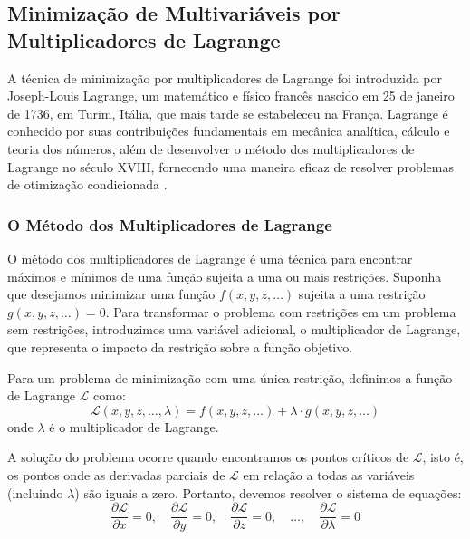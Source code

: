 \subsection{Minimização de Multivariáveis por Multiplicadores de Lagrange}

A técnica de minimização por multiplicadores de Lagrange foi introduzida por Joseph-Louis Lagrange, um matemático e físico francês nascido em 25 de janeiro de 1736, em Turim, Itália, que mais tarde se estabeleceu na França. Lagrange é conhecido por suas contribuições fundamentais em mecânica analítica, cálculo e teoria dos números, além de desenvolver o método dos multiplicadores de Lagrange no século XVIII, fornecendo uma maneira eficaz de resolver problemas de otimização condicionada \cite{lagrange}.

\subsubsection{O Método dos Multiplicadores de Lagrange}

O método dos multiplicadores de Lagrange é uma técnica para encontrar máximos e mínimos de uma função sujeita a uma ou mais restrições. Suponha que desejamos minimizar uma função $f(x, y, z, \dots)$ sujeita a uma restrição $g(x, y, z, \dots) = 0$. Para transformar o problema com restrições em um problema sem restrições, introduzimos uma variável adicional, o multiplicador de Lagrange, que representa o impacto da restrição sobre a função objetivo.

Para um problema de minimização com uma única restrição, definimos a função de Lagrange $\mathcal{L}$ como:
\begin{equation}
\mathcal{L}(x, y, z, \dots, \lambda) = f(x, y, z, \dots) + \lambda \cdot g(x, y, z, \dots)
\label{eq:lagrange_single_constraint}
\end{equation}
onde $\lambda$ é o multiplicador de Lagrange.

A solução do problema ocorre quando encontramos os pontos críticos de $\mathcal{L}$, isto é, os pontos onde as derivadas parciais de $\mathcal{L}$ em relação a todas as variáveis (incluindo $\lambda$) são iguais a zero. Portanto, devemos resolver o sistema de equações:
\begin{equation}
\frac{\partial \mathcal{L}}{\partial x} = 0, \quad \frac{\partial \mathcal{L}}{\partial y} = 0, \quad \frac{\partial \mathcal{L}}{\partial z} = 0, \quad \dots, \quad \frac{\partial \mathcal{L}}{\partial \lambda} = 0
\label{eq:lagrange_critical_points}
\end{equation}

